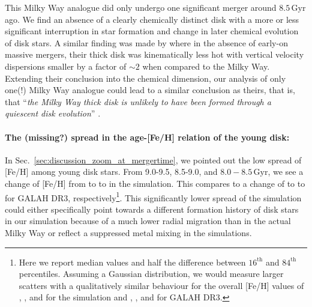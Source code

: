 \documentclass[fleqn,usenatbib]{mnras}
\begin{document}
This Milky Way analogue did only undergo one significant merger around $8.5\,\mathrm{Gyr}$ ago. We find an absence of a clearly chemically distinct disk with a more or less significant interruption in star formation and change in later chemical evolution of disk stars. A similar finding was made by \citet{MCM2013} where in the absence of early-on massive mergers, their thick disk was kinematically less hot with vertical velocity dispersions smaller by a factor of $\sim 2$ when compared to the Milky Way. Extending their conclusion into the chemical dimension, our analysis of only one(!) Milky Way analogue could lead to a similar conclusion as theirs, that is, that ``\textit{the Milky Way thick disk is unlikely to have been formed through a quiescent disk evolution}'' \citep{MCM2013}.

\paragraph*{The (missing?) spread in the age-[Fe/H] relation of the young disk:}

In Sec.~\ref{sec:discussion_zoom_at_mergertime}, we pointed out the low spread of [Fe/H] among young disk stars. From 9.0-9.5, 8.5-9.0, and $8.0-8.5\,\mathrm{Gyr}$, we see a change of [Fe/H] from  to  to  in the simulation. This compares to a change of  to  to  for GALAH DR3, respectively\footnote{Here we report median values and half the difference between $16^\mathrm{th}$ and $84^\mathrm{th}$ percentiles. Assuming a Gaussian distribution, we would measure larger scatters with a qualitatively similar behaviour for the overall [Fe/H] values of ,  , and   for the simulation and ,  , and  for GALAH DR3.}. This significantly lower spread of the simulation could either specifically point towards a different formation history of disk stars in our simulation because of a much lower radial migration than in the actual Milky Way  \citep{Minchev2010, Loebman2011, Frankel2018} or reflect a suppressed metal mixing in the simulations.
\end{document}
